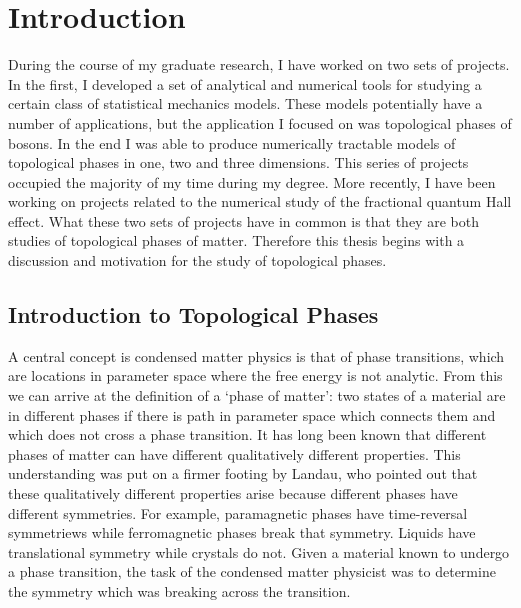 \chapter{Introduction}

During the course of my graduate research, I have worked on two sets of projects. In the first, I developed a set of analytical and numerical tools for studying a certain class of statistical mechanics models. These models potentially have a number of applications, but the application I focused on was topological phases of bosons. In the end I was able to produce numerically tractable models of topological phases in one, two and three dimensions. This series of projects occupied the majority of my time during my degree. 
More recently, I have been working on projects related to the numerical study of the fractional quantum Hall effect. What these two sets of projects have in common is that they are both studies of topological phases of matter. Therefore this thesis begins with a discussion and motivation for the study of topological phases.

\section{Introduction to Topological Phases}

A central concept is condensed matter physics is that of phase transitions, which are locations in parameter space where the free energy is not analytic. From this we can arrive at the definition of a `phase of matter': two states of a material are in different phases if there is path in parameter space which connects them and which does not cross a phase transition. It has long been known that different phases of matter can have different qualitatively different properties. This understanding was put on a firmer footing by Landau\cite{Wen_book}, who pointed out that these qualitatively different properties arise because different phases have different symmetries.  For example, paramagnetic phases have time-reversal symmetriews while ferromagnetic phases break that symmetry. Liquids have translational symmetry while crystals do not. Given a material known to undergo a phase transition, the task of the condensed matter physicist was to determine the symmetry which was breaking across the transition.




